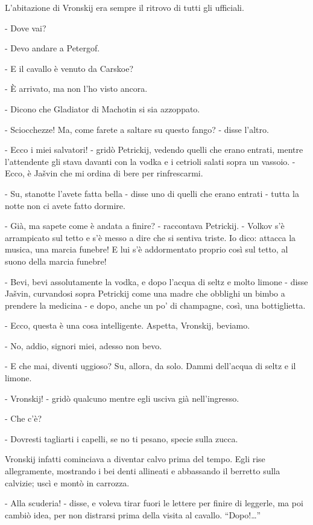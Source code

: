 L'abitazione di Vronskij era sempre il ritrovo di tutti gli ufficiali. 

- Dove vai? 

- Devo andare a Petergof. 

- E il cavallo è venuto da Carskoe? 

- È arrivato, ma non l'ho visto ancora. 

- Dicono che Gladiator di Machotin si sia azzoppato. 

- Sciocchezze! Ma, come farete a saltare su questo fango? - disse l'altro. 

- Ecco i miei salvatori! - gridò Petrickij, vedendo quelli che erano entrati, mentre l'attendente gli stava davanti con la vodka e i cetrioli salati sopra un vassoio. - Ecco, è Jašvin che mi ordina di bere per rinfrescarmi. 

- Su, stanotte l'avete fatta bella - disse uno di quelli che erano entrati - tutta la notte non ci avete fatto dormire. 

- Già, ma sapete come è andata a finire? - raccontava Petrickij. - Volkov s'è arrampicato sul tetto e s'è messo a dire che si sentiva triste. Io dico: attacca la musica, una marcia funebre! E lui s'è addormentato proprio così sul tetto, al suono della marcia funebre! 

- Bevi, bevi assolutamente la vodka, e dopo l'acqua di seltz e molto limone - disse Jašvin, curvandosi sopra Petrickij come una madre che obblighi un bimbo a prendere la medicina - e dopo, anche un po' di champagne, così, una bottiglietta. 

- Ecco, questa è una cosa intelligente. Aspetta, Vronskij, beviamo. 

- No, addio, signori miei, adesso non bevo. 

- E che mai, diventi uggioso? Su, allora, da solo. Dammi dell'acqua di seltz e il limone. 

- Vronskij! - gridò qualcuno mentre egli usciva già nell'ingresso. 

- Che c'è? 

- Dovresti tagliarti i capelli, se no ti pesano, specie sulla zucca. 

Vronskij infatti cominciava a diventar calvo prima del tempo. Egli rise allegramente, mostrando i bei denti allineati e abbassando il berretto sulla calvizie; uscì e montò in carrozza. 

- Alla scuderia! - disse, e voleva tirar fuori le lettere per finire di leggerle, ma poi cambiò idea, per non distrarsi prima della visita al cavallo. ``Dopo!\ldots{}''

